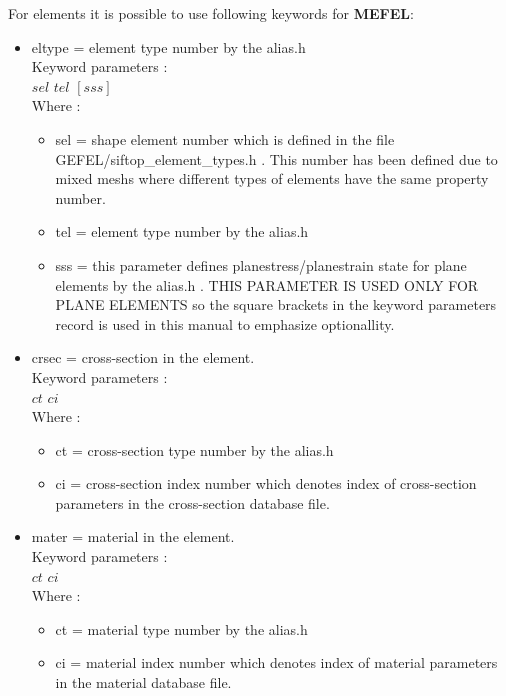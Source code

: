 \documentclass[12pt]{book}
\begin{document}
For elements it is possible to use following keywords for {\bf MEFEL}:
\begin{itemize}
\item eltype = element type number by the alias.h\\
         Keyword parameters :\\
         $sel$ $tel$ $[sss]$\\
         Where :
         \begin{itemize}
         \item sel = shape element number which is defined in the file
               GEFEL/siftop\_element\_types.h . This number has been defined
               due to mixed meshs where different types of elements
               have the same property number.
         \item tel = element type number by the alias.h
         \item sss = this parameter defines planestress/planestrain state
               for plane elements by the alias.h . THIS PARAMETER IS
               USED ONLY FOR PLANE ELEMENTS so the square brackets in the
               keyword parameters record is used in this manual to emphasize
               optionallity.
         \end{itemize}
\item crsec  = cross-section in the element.\\
         Keyword parameters :\\
         $ct$ $ci$\\
         Where :
         \begin {itemize}
         \item ct = cross-section type number by the alias.h
         \item ci = cross-section index number which denotes index of
              cross-section parameters in the cross-section database file.
         \end{itemize}
\item mater = material in the element.\\
        Keyword parameters :\\
        $ct$ $ci$\\
        Where :
        \begin{itemize}
        \item ct = material type number by the alias.h
        \item ci = material index number which denotes index of
             material parameters in the material database file.
        \end{itemize}

\end{itemize}
\end{document}

